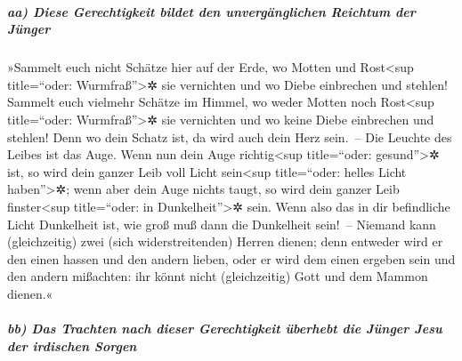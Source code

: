 \hypertarget{aa-diese-gerechtigkeit-bildet-den-unverguxe4nglichen-reichtum-der-juxfcnger}{%
\subparagraph{aa) Diese Gerechtigkeit bildet den unvergänglichen
Reichtum der
Jünger}\label{aa-diese-gerechtigkeit-bildet-den-unverguxe4nglichen-reichtum-der-juxfcnger}}

 »Sammelt euch nicht Schätze hier auf der Erde, wo Motten
und Rost\textless sup title=``oder: Wurmfraß''\textgreater✲ sie
vernichten und wo Diebe einbrechen und stehlen!  Sammelt
euch vielmehr Schätze im Himmel, wo weder Motten noch Rost\textless sup
title=``oder: Wurmfraß''\textgreater✲ sie vernichten und wo keine Diebe
einbrechen und stehlen!  Denn wo dein Schatz ist, da wird
auch dein Herz sein.~--  Die Leuchte des Leibes ist das
Auge. Wenn nun dein Auge richtig\textless sup title=``oder:
gesund''\textgreater✲ ist, so wird dein ganzer Leib voll Licht
sein\textless sup title=``oder: helles Licht haben''\textgreater✲;
 wenn aber dein Auge nichts taugt, so wird dein ganzer
Leib finster\textless sup title=``oder: in Dunkelheit''\textgreater✲
sein. Wenn also das in dir befindliche Licht Dunkelheit ist, wie groß
muß dann die Dunkelheit sein!~--  Niemand kann
(gleichzeitig) zwei (sich widerstreitenden) Herren dienen; denn entweder
wird er den einen hassen und den andern lieben, oder er wird dem einen
ergeben sein und den andern mißachten: ihr könnt nicht (gleichzeitig)
Gott und dem Mammon dienen.«

\hypertarget{bb-das-trachten-nach-dieser-gerechtigkeit-uxfcberhebt-die-juxfcnger-jesu-der-irdischen-sorgen}{%
\subparagraph{bb) Das Trachten nach dieser Gerechtigkeit überhebt die
Jünger Jesu der irdischen
Sorgen}\label{bb-das-trachten-nach-dieser-gerechtigkeit-uxfcberhebt-die-juxfcnger-jesu-der-irdischen-sorgen}}


